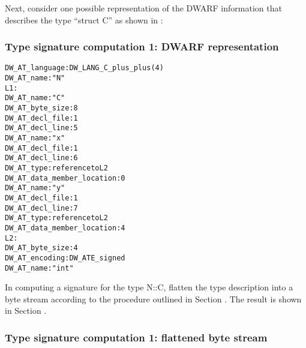 Next, consider one possible representation of the DWARF
information that describes the type “struct C” as shown
in 
:

\subsubsection{Type signature  computation 1: DWARF representation}
\label{app:typesignaturecomputation1dwarfrepresentation}

\begin{alltt}
      DW\-\_AT\-\_language: DW\-\_LANG\-\_C\-\_plus\-\_plus (4)
        DW\-\_AT\-\_name: "N"
L1:
          DW\-\_AT\-\_name: "C"
          DW\-\_AT\-\_byte\-\_size: 8
          DW\-\_AT\-\_decl\-\_file: 1
          DW\-\_AT\-\_decl\-\_line: 5
            DW\-\_AT\-\_name: "x"
            DW\-\_AT\-\_decl\-\_file: 1
            DW\-\_AT\-\_decl\-\_line: 6
            DW\-\_AT\-\_type: reference to L2
            DW\-\_AT\-\_data\-\_member\-\_location: 0
            DW\-\_AT\-\_name: "y"
            DW\-\_AT\-\_decl\-\_file: 1
            DW\-\_AT\-\_decl\-\_line: 7
            DW\-\_AT\-\_type: reference to L2
            DW\-\_AT\-\_data\-\_member\-\_location: 4
L2:
         DW\-\_AT\-\_byte\-\_size: 4
         DW\-\_AT\-\_encoding: DW\-\_ATE\-\_signed
         DW\-\_AT\-\_name: "int"
\end{alltt}

In computing a signature for the type N::C, flatten the type
description into a byte stream according to the procedure
outlined in 
Section .
The result is shown in 
Section .

\subsubsection{Type signature  computation 1: flattened byte stream}
\label{app:typesignaturecomputation1flattenedbytestream}

